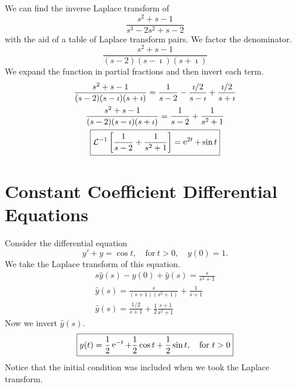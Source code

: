 \begin{Example}
  We can find the inverse Laplace transform of
  \[ 
  \frac{s^2 + s - 1}{s^3 - 2s^2 + s - 2}
  \]
  with the aid of a table of Laplace transform pairs.
  We factor the denominator.
  \[
  \frac{s^2 + s - 1}{(s - 2)(s - \imath)(s + \imath)}
  \]
  We expand the function in partial fractions and then invert each term.
  \begin{gather*}
    \frac{s^2 + s - 1}{(s - 2)(s - \imath)(s + \imath)} 
    = \frac{1}{s-2} - \frac{\imath / 2}{s - \imath} + \frac{\imath / 2}{s + \imath} 
    \\
    \frac{s^2 + s - 1}{(s - 2)(s - \imath)(s + \imath)} 
    = \frac{1}{s-2} + \frac{1}{s^2 + 1}
    \\
    \boxed{
      \mathcal{L}^{-1}\left[ \frac{1}{s-2} + \frac{1}{s^2+1} \right]
      = \mathop{\mathrm{e}}\nolimits^{2t} + \sin t
      } 
  \end{gather*}
\end{Example}















\section{Constant Coefficient Differential Equations}









\begin{Example}
  Consider the differential equation
  \[ 
  y' + y = \cos t, \quad \mathrm{for}\ t > 0, \quad y(0) = 1.
  \]
  We take the Laplace transform of this equation.
  \begin{gather*}
    s \hat{y}(s) - y(0) + \hat{y}(s) = \frac{s}{s^2 + 1} \\
    \hat{y}(s) = \frac{s}{(s+1)(s^2+1)} + \frac{1}{s+1} \\
    \hat{y}(s) = \frac{1/2}{s+1} + \frac{1}{2}\frac{s+1}{s^2+1}
  \end{gather*}
  Now we invert $\hat{y}(s)$.
  \[ 
  \boxed{
    y(t) = \frac{1}{2} \mathop{\mathrm{e}}\nolimits^{-t} + \frac{1}{2} \cos t + \frac{1}{2} \sin t,
    \quad \mathrm{for}\ t > 0
    } 
  \]
  Notice that the initial condition was included when we took the 
  Laplace transform.
\end{Example}







